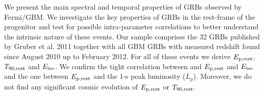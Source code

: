 


\bigskip



\bigskip

\noindent We present the main spectral and temporal properties of GRBs observed by Fermi/GBM. We investigate the key properties of GRBs in the rest-frame of the progenitor and test for possible intra-parameter correlations to better understand the intrinsic nature of these events.
Our sample comprises the 32 GRBs published by Gruber et al. 2011 together with all GBM GRBs with measured redshift found since August 2010 up to February 2012. For all of these events we derive $E_{\rm p,rest}$, $T_{90,{\rm rest}}$ and $E_{\rm iso}$. We confirm the tight correlation between and $E_{\rm p,rest}$ and $E_{\rm iso}$ and the one between $E_{\rm p,rest}$ and the 1-s peak luminosity ($L_p$). Moreover, we do not find any significant cosmic evolution of $E_{\rm p,rest}$ or $T_{90,{\rm rest}}$.

